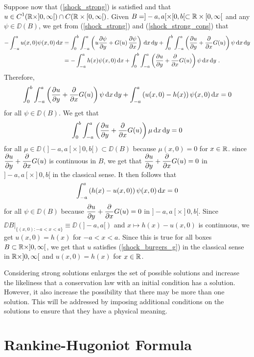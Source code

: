 Suppose now that (\ref{shock_strong}) is satisfied
and that $\displaystyle u \in C^1(\RR \times ]0,\infty[)
\cap C(\RR \times [0,\infty[)$.
Given $B = ]-a,a[ \times [0,b[ \subset \RR \times [0,\infty[$
and any $\psi \in \DD(B)$, we get from
(\ref{shock_strong}) and (\ref{shock_strong_cons}) that
\begin{align*}
-\int_{-a}^a u(x,0)\psi(x,0) \dx{x}
&= \int_0^b \int_{-a}^a
\left( u \pdydx{\psi}{y} + G(u)\,\pdydx{\psi}{x}
\right) \dx{x}\dx{y}
+ \int_0^b \int_{-a}^a
\left( \pdydx{u}{y} + \pdfdx{G(u)}{x}\right) \psi \dx{x}\dx{y} \\
&= - \int_{-a}^a h(x)\psi(x,0) \dx{x} 
+ \int_0^b \int_{-a}^a
 \left( \pdydx{u}{y} + \pdfdx{G(u)}{x}\right) \psi \dx{x}\dx{y} \ .
\end{align*}
Therefore,
\[
\int_0^b \int_{-a}^a
\left( \pdydx{u}{y} + \pdfdx{G(u)}{x}\right) \psi \dx{x}\dx{y} 
+ \int_{-a}^a \left( u(x,0) - h(x) \right) \psi(x,0) \dx{x} = 0
\]
for all $\psi \in \DD(B)$.  We get that
\[
\int_0^b \int_{-a}^a \left(\pdydx{u}{y} + \pdfdx{G(u)}{x} \right)
\mu \dx{x}\dx{y}  = 0
\]
for all $\mu \in \DD(]-a,a[\times ]0,b[) \subset \DD(B)$ because
$\mu(x,0) = 0$ for $x\in \RR$.  since
$\displaystyle \pdydx{u}{y} + \pdfdx{G(u)}{x}$ is
continuous in $B$, we get that
$\displaystyle \pdydx{u}{y} + \pdfdx{G(u)}{x} = 0$ in
$]-a,a[\times]0,b[$ in the classical sense. 
It then follows that
\[
\int_{-a}^a \left( h(x) - u(x,0) \right) \psi(x,0) \dx{x} = 0
\]
for all $\psi \in \DD(B)$ because
$\displaystyle \pdydx{u}{y} + \pdfdx{G(u)}{x} = 0$ in $]-a,a[\times ]0,b[$.
Since $\displaystyle \DD{B}\big|_{\{(x,0):-a < x <a\}} \equiv \DD(]-a,a[)$
and $x\mapsto h(x) - u(x,0)$ is continuous, we get
$u(x,0) = h(x)$ for $-a < x < a$.  Since this is true for all boxes
$B \subset \RR\times ]0,\infty[$, we get that $u$
satisfies (\ref{shock_burgers_g}) in the classical
sense in $\RR \times ]0,\infty[$ and $u(x,0) = h(x)$ for $x \in \RR$.

Considering strong solutions enlarges the set of possible solutions
and increase the likeliness that a conservation law with an initial
condition has a solution.  However, it also increase the possibility
that there may be more than one solution.  This will be addressed by
imposing additional conditions on the solutions to ensure that they
have a physical meaning.

\section{Rankine-Hugoniot Formula} \label{sectRankHugo}

